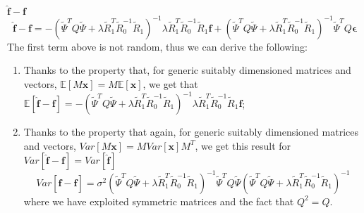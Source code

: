 $\hat{\bm{f}} - \bm{f}$
\begin{equation}
	\hat{\bm{f}} - \bm{f} =
	-\left(\tilde{\Psi}^TQ\tilde{\Psi} +\lambda \tilde{R}_1^T \tilde{R}_0^{-1} \tilde{R}_1 \right)^{-1}
	\lambda \tilde{R}_1^T \tilde{R}_0^{-1} \tilde{R}_1 \bm{f} +
	\left(\tilde{\Psi}^TQ\tilde{\Psi} +\lambda \tilde{R}_1^T \tilde{R}_0^{-1} \tilde{R}_1 \right)^{-1}
	\tilde{\Psi}^T Q \bm{\epsilon}
\end{equation}
The first term above is not random, thus we can derive the following:
\begin{enumerate}[wide, labelindent=0pt]
	\item Thanks to the property that, for generic suitably dimensioned matrices and vectors, $\mathbb{E}\left[M \bm{x}\right] = M \mathbb{E}\left[\bm{x}\right]$, we get that $\mathbb{E}\left[\hat{\bm{f}} - \bm{f}\right] =
		      -\left(\tilde{\Psi}^TQ\tilde{\Psi} +\lambda \tilde{R}_1^T \tilde{R}_0^{-1} \tilde{R}_1 \right)^{-1}
		      \lambda \tilde{R}_1^T \tilde{R}_0^{-1} \tilde{R}_1 \bm{f}$;
	\item Thanks to the property that again, for generic suitably dimensioned matrices and vectors, $Var  \left[M \bm{x}\right] = M Var\left[\bm{x}\right] M^T$, we get this result for $Var\left[\hat{\bm{f}} - \bm{f}\right] = Var \left[\hat{\bm{f}}\right]$
	      \begin{equation}
		      Var\left[\hat{\bm{f}} - \bm{f}\right] =
		      \sigma^2 \left(\tilde{\Psi}^TQ\tilde{\Psi} +\lambda \tilde{R}_1^T \tilde{R}_0^{-1} \tilde{R}_1 \right)^{-1} \tilde{\Psi}^T Q
		      \tilde{\Psi} \left(\tilde{\Psi}^TQ\tilde{\Psi} +\lambda \tilde{R}_1^T \tilde{R}_0^{-1} \tilde{R}_1 \right)^{-1}
	      \end{equation}
	      where we have exploited symmetric matrices and the fact that $Q^2 =
		      Q$.
\end{enumerate}
